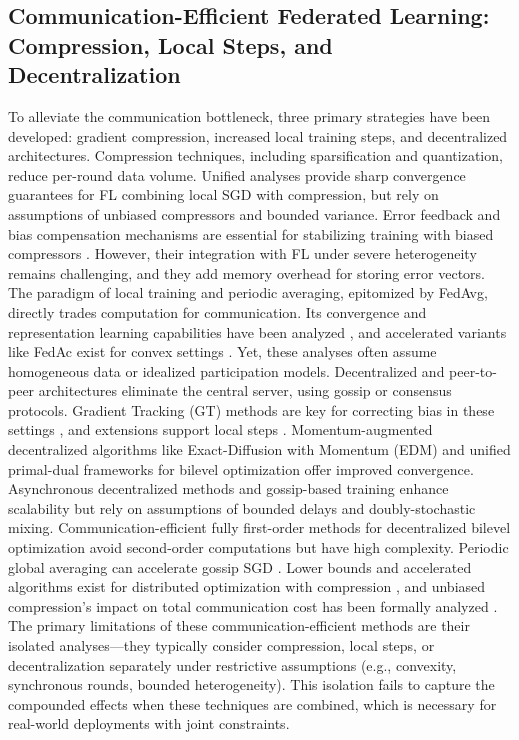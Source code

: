 \documentclass[11pt]{article}
\begin{document}
\subsection{Communication-Efficient Federated Learning: Compression, Local Steps, and Decentralization}
To alleviate the communication bottleneck, three primary strategies have been developed: gradient compression, increased local training steps, and decentralized architectures. Compression techniques, including sparsification and quantization, reduce per-round data volume. Unified analyses \citep{Haddadpour2020FederatedLW} provide sharp convergence guarantees for FL combining local SGD with compression, but rely on assumptions of unbiased compressors and bounded variance. Error feedback and bias compensation mechanisms are essential for stabilizing training with biased compressors \citep{horvath2023stochastic}. However, their integration with FL under severe heterogeneity remains challenging, and they add memory overhead for storing error vectors. The paradigm of local training and periodic averaging, epitomized by FedAvg, directly trades computation for communication. Its convergence and representation learning capabilities have been analyzed \citep{li2019convergence, collins2022fedavg}, and accelerated variants like FedAc exist for convex settings \citep{Yuan2020FederatedAS}. Yet, these analyses often assume homogeneous data \citep{Yuan2020FederatedAS} or idealized participation models. Decentralized and peer-to-peer architectures eliminate the central server, using gossip or consensus protocols. Gradient Tracking (GT) methods are key for correcting bias in these settings \citep{koloskova2021improved}, and extensions support local steps \citep{Liu2023DecentralizedGT}. Momentum-augmented decentralized algorithms like Exact-Diffusion with Momentum (EDM) \citep{Hu2025ABD} and unified primal-dual frameworks for bilevel optimization \citep{Zhu2024SPARKLEAU} offer improved convergence. Asynchronous decentralized methods \citep{Lian2017AsynchronousDP} and gossip-based training \citep{blot2016gossip, Blot2018GoSGDDO} enhance scalability but rely on assumptions of bounded delays and doubly-stochastic mixing. Communication-efficient fully first-order methods for decentralized bilevel optimization \citep{Wen2024ACA} avoid second-order computations but have high complexity. Periodic global averaging can accelerate gossip SGD \citep{chen2021acceleraccelerating}. Lower bounds and accelerated algorithms exist for distributed optimization with compression \citep{He2023LowerBA}, and unbiased compression's impact on total communication cost has been formally analyzed \citep{He2023UnbiasedCS}. The primary limitations of these communication-efficient methods are their isolated analyses—they typically consider compression, local steps, or decentralization separately under restrictive assumptions (e.g., convexity, synchronous rounds, bounded heterogeneity). This isolation fails to capture the compounded effects when these techniques are combined, which is necessary for real-world deployments with joint constraints.
\end{document}
